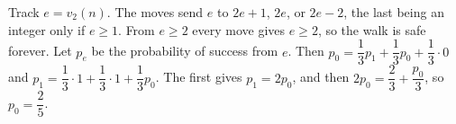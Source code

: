 Track $e=v_2(n)$. The moves send $e$ to $2e+1$, $2e$, or $2e-2$, the last being an integer only if $e\ge1$. From $e\ge2$ every move gives $e\ge2$, so the walk is safe forever. Let $p_e$ be the probability of success from $e$. Then $p_0=\dfrac13p_1+\dfrac13p_0+\dfrac13\cdot0$ and $p_1=\dfrac13\cdot1+\dfrac13\cdot1+\dfrac13p_0$. The first gives $p_1=2p_0$, and then $2p_0=\dfrac23+\dfrac{p_0}3$, so $p_0=\boxed{\dfrac25}$.
